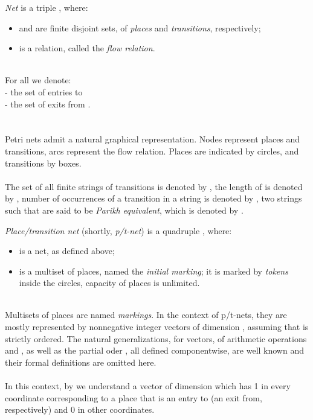 \documentclass[a4paper]{llncs}
\begin{document}
\begin{definition}[Nets]
\label{d21}
\emph{Net} is a triple , where:
\begin{itemize}
\item  and  are finite disjoint sets, of \emph{places} and \emph{transitions}, respectively;
\item  is a relation, called the \emph{flow relation}.
\end{itemize}
\end{definition}\mbox{ }\\
\indent For all  we denote:\\
\indent  -  the set of entries to \\
\indent  -  the set of exits from .\\
\\ \\
\newpage
Petri nets admit a natural graphical representation. Nodes represent places and transitions, arcs represent the flow relation. Places are indicated by circles, and transitions by boxes.
\\ \\
The set of all finite strings of transitions is denoted by , the length of  is denoted by , number of occurrences of a transition  in a string  is denoted by , two strings  such that   are said to be \emph{Parikh equivalent}, which is denoted by .
\\
\begin{definition}
\label{d22}
\emph{Place/transition net} (shortly, \emph{p/t-net}) is a quadruple , where:
\begin{itemize}
\item  is a net, as defined above;
\item  is a multiset of places, named the \emph{initial marking}; it is marked by \emph{tokens} inside the circles, capacity of places is unlimited.
\end{itemize}
\end{definition}\mbox{ }\\
Multisets of places are named \emph{markings}. In the context of p/t-nets, they are mostly represented by nonnegative integer vectors of dimension , assuming that  is strictly ordered. The natural generalizations, for vectors, of arithmetic operations  and , as well as the partial oder , all defined componentwise, are well known and their formal definitions are omitted here.
\\ \\
In this context, by  we understand a vector of dimension  which has 1 in every coordinate corresponding to a place that is an entry to (an exit from, respectively)  and 0 in other coordinates.
\end{document}
